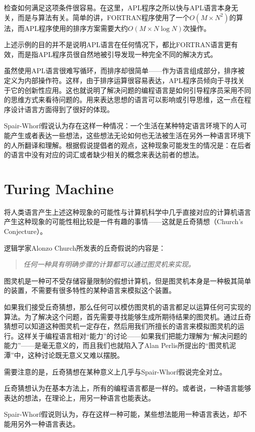 检查如何满足这项条件很容易。在这里，APL程序之所以快与APL语言本身无关，而是与算法有关。简单的讲，FORTRAN程序使用了一个$O(M\times N^2)$的算法，而APL程序使用的排序方案需要大约$O(M\times N\log N)$次操作。


上述示例的目的并不是说明APL语言在任何情况下，都比FORTRAN语言更有效，而是指APL程序员很自然地被引导发现一种完全不同的解决方式。

虽然使用APL语言很难写循环，而排序却很简单——作为语言组成部分，排序被定义为内部操作符。这样，由于排序运算很容易表达，APL程序员倾向于寻找关于它的创新性应用。这也就说明了解决问题的编程语言是如何引导程序员采用不同的思维方式来看待问题的。用来表达思想的语言可以影响或引导思维，这一点在程序设计语言方面得到了很好的体现。

Spair-Whorf假说认为存在这样一种情况：一个生活在某种特定语言环境下的人可能产生或者表达一些想法，这些想法无论如何也无法被生活在另外一种语言环境下的人所翻译和理解。根据假说提倡者的观点，这种现象可能发生的情况是：在后者的语言中没有对应的词汇或者缺少相关的概念来表达前者的想法。


\section{Turing Machine}

将人类语言产生上述这种现象的可能性与计算机科学中几乎直接对应的计算机语言产生这种现象的可能性相比较是一件有趣的事情——这就是丘奇猜想（Church’s Conjecture）。


逻辑学家Alonzo Church所发表的丘奇假说的内容是：
\begin{quote}
\emph{任何一种具有明确步骤的计算都可以通过图灵机来实现。}
\end{quote}





图灵机是一种可不受存储容量限制的假想计算机，但是图灵机本身是一种极其简单的装置，不需要有很多特性的某种语言来模拟这个装置。

如果我们接受丘奇猜想，那么任何可以模仿图灵机的语言都足以运算任何可实现的算法。为了解决这个问题，首先需要寻找能够生成所期待结果的图灵机。通过丘奇猜想可以知道这种图灵机一定存在，然后用我们所擅长的语言来模拟图灵机的运行。这样关于编程语言相对“能力”的讨论——如果我们把能力理解为“解决问题的能力”——是毫无意义的，而且我们也就陷入了Alan Perlis所提出的“图灵机泥潭”中，这种讨论既无意义又难以摆脱。



需要注意的是，丘奇猜想在某种意义上几乎与Spair-Whorf假说完全对立。


\begin{compactitem}
\item 丘奇猜想认为在基本方法上，所有的编程语言都是一样的。或者说，一种语言能够表达的想法，在理论上，用另一种语言也能表达。
\item Spair-Whorf假说则认为，存在这样一种可能，某些想法能用一种语言表达，却不能用另外一种语言表达。
\end{compactitem}


